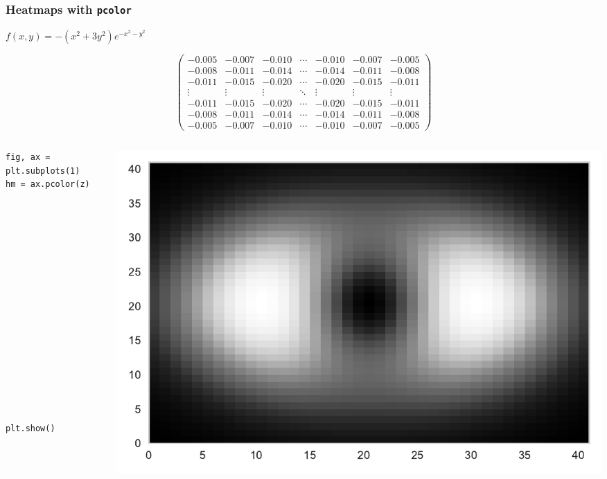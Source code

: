 \documentclass{beamer}
\begin{document}
\begin{frame}[fragile]
\frametitle{Heatmaps with \texttt{pcolor}}
\vfill
\begin{center}
$f(x, y) = -\left(x^2+3y^2\right)e^{-x^2-y^2}$
\end{center}
\vfill
\begin{equation*}
\begin{pmatrix}
-0.005 & -0.007 & -0.010 & \cdots & -0.010 & -0.007 & -0.005 \\
-0.008 & -0.011 & -0.014 & \cdots & -0.014 & -0.011 & -0.008 \\
-0.011 & -0.015 & -0.020 & \cdots & -0.020 & -0.015 & -0.011 \\
\vdots & \vdots & \vdots & \ddots & \vdots & \vdots & \vdots \\
-0.011 & -0.015 & -0.020 & \cdots & -0.020 & -0.015 & -0.011 \\
-0.008 & -0.011 & -0.014 & \cdots & -0.014 & -0.011 & -0.008 \\
-0.005 & -0.007 & -0.010 & \cdots & -0.010 & -0.007 & -0.005
\end{pmatrix}
\end{equation*}
\vfill
\end{frame}


\begin{frame}[fragile]
\tiny{
\begin{columns}
\begin{column}{0.45\textwidth}
\begin{verbatim}
fig, ax = plt.subplots(1)
hm = ax.pcolor(z)

















plt.show()
\end{verbatim}
\end{column}
\begin{column}{0.55\textwidth}
\includegraphics[width=\textwidth]{heatmap_1.pdf}
\end{column}
\end{columns}
}
\end{frame}
\end{document}
